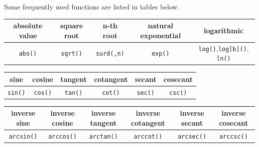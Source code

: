 \documentclass[
  en,11pt,simple]{elegantbook}
\begin{document}
Some frequently used functions are listed in tables below.

\begin{longtable}[]{@{}ccccc@{}}
\toprule
absolute value & square root & n-th root & natural exponential & logarithmic\tabularnewline
\midrule
\endhead
\texttt{abs()} & \texttt{sqrt()} & \texttt{surd(,n)} & \texttt{exp()} & \texttt{log()},\texttt{log{[}b{]}()}, \texttt{ln()}\tabularnewline
\bottomrule
\end{longtable}

\begin{longtable}[]{@{}cccccc@{}}
\toprule
sine & cosine & tangent & cotangent & secant & cosecant\tabularnewline
\midrule
\endhead
\texttt{sin()} & \texttt{cos()} & \texttt{tan()} & \texttt{cot()} & \texttt{sec()} & \texttt{csc()}\tabularnewline
\bottomrule
\end{longtable}

\begin{longtable}[]{@{}cccccc@{}}
\toprule
\begin{minipage}[b]{0.13\columnwidth}\centering
inverse sine\strut
\end{minipage} & \begin{minipage}[b]{0.13\columnwidth}\centering
inverse cosine\strut
\end{minipage} & \begin{minipage}[b]{0.13\columnwidth}\centering
inverse tangent\strut
\end{minipage} & \begin{minipage}[b]{0.16\columnwidth}\centering
inverse cotangent\strut
\end{minipage} & \begin{minipage}[b]{0.13\columnwidth}\centering
inverse secant\strut
\end{minipage} & \begin{minipage}[b]{0.15\columnwidth}\centering
inverse cosecant\strut
\end{minipage}\tabularnewline
\midrule
\endhead
\begin{minipage}[t]{0.13\columnwidth}\centering
\texttt{arcsin()}\strut
\end{minipage} & \begin{minipage}[t]{0.13\columnwidth}\centering
\texttt{arccos()}\strut
\end{minipage} & \begin{minipage}[t]{0.13\columnwidth}\centering
\texttt{arctan()}\strut
\end{minipage} & \begin{minipage}[t]{0.16\columnwidth}\centering
\texttt{arccot()}\strut
\end{minipage} & \begin{minipage}[t]{0.13\columnwidth}\centering
\texttt{arcsec()}\strut
\end{minipage} & \begin{minipage}[t]{0.15\columnwidth}\centering
\texttt{arccsc()}\strut
\end{minipage}\tabularnewline
\bottomrule
\end{longtable}
\end{document}
